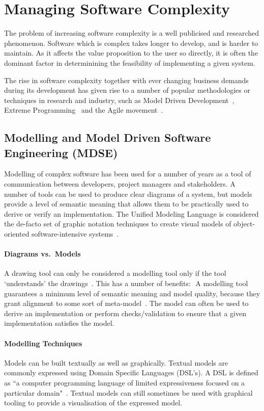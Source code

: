 \documentclass{cshonours}
\begin{document}
\section{Managing Software Complexity}

The problem of increasing software complexity is a well publicised and researched phenomenon. Software which is complex takes longer to develop, and is harder to maintain. As it affects the value proposition to the user so directly, it is often the dominant factor in determinining the feasibility of implementing a given system.

The rise in software complexity together with ever changing business demands during its development has given rise to a number of popular methodologies or techniques in research and industry, such as Model Driven Development~\cite{MDD}, Extreme Programming~\cite{BeckXP} and the Agile movement~\cite{AgileManifesto}.

\subsection{Modelling and Model Driven Software Engineering (MDSE)}

Modelling of complex software has been used for a number of years as a tool of communication between developers, project managers and stakeholders. A number of tools can be used to produce clear diagrams of a system, but models provide a level of semantic meaning that allows them to be practically used to derive or verify an implementation. The Unified Modeling Language is considered the de-facto set of graphic notation techniques to create visual models of object-oriented software-intensive systems~\cite{UMLDefinition}.

\paragraph{Diagrams vs.\ Models}
A drawing tool can only be considered a modelling tool only if the tool `understands' the drawings~\cite[p.~11]{ModelDrivenDevelopment}. This has a number of benefits: 
A modelling tool guarantees a minimum level of semantic meaning and model quality, because they grant alignment to some sort of meta-model~\cite[p.~12]{ModelDrivenDevelopment}.
The model can often be used to derive an implementation or perform checks/validation to ensure that a given implementation satisfies the model. 

\paragraph{Modelling Techniques}
Models can be built textually as well as graphically. Textual models are commonly expressed using Domain Specific Languages (DSL’s). A DSL is defined as ``a computer programming language of limited expressiveness focused on a particular domain"~\cite{FowlerDSL}. Textual models can still sometimes be used with graphical tooling to provide a visualisation of the expressed model.
\end{document}
